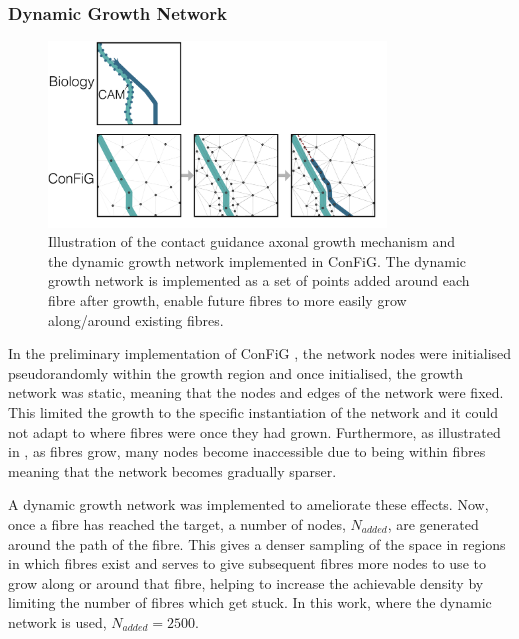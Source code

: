 \subsubsection{Dynamic Growth Network}
\label{sec:config_dynam_growth}

\begin{figure}
  \centering
  \includegraphics[width=0.8\textwidth]{figures/config/biological_cam.png}
  \caption[Illustration of the contact guidance mechanism]{Illustration of the contact guidance axonal growth mechanism and the dynamic growth network implemented in \ac{ConFiG}. The dynamic growth network is implemented as a set of points added around each fibre after growth, enable future fibres to more easily grow along/around existing fibres.}
  \label{fig:config_dynam_growth}
\end{figure}

In the preliminary implementation of \ac{ConFiG} \cite{Callaghan2019}, the network nodes were initialised pseudorandomly within the growth region and once initialised, the growth network was static, meaning that the nodes and edges of the network were fixed. This limited the growth to the specific instantiation of the network and it could not adapt to where fibres were once they had grown. Furthermore, as illustrated in , as fibres grow, many nodes become inaccessible due to being within fibres meaning that the network becomes gradually sparser.

A dynamic growth network was implemented to ameliorate these effects. Now, once a fibre has reached the target, a number of nodes, $N_{added}$, are generated around the path of the fibre. This gives a denser sampling of the space in regions in which fibres exist and serves to give subsequent fibres more nodes to use to grow along or around that fibre, helping to increase the achievable density by limiting the number of fibres which get stuck. In this work, where the dynamic network is used, $N_{added}=2500$.

